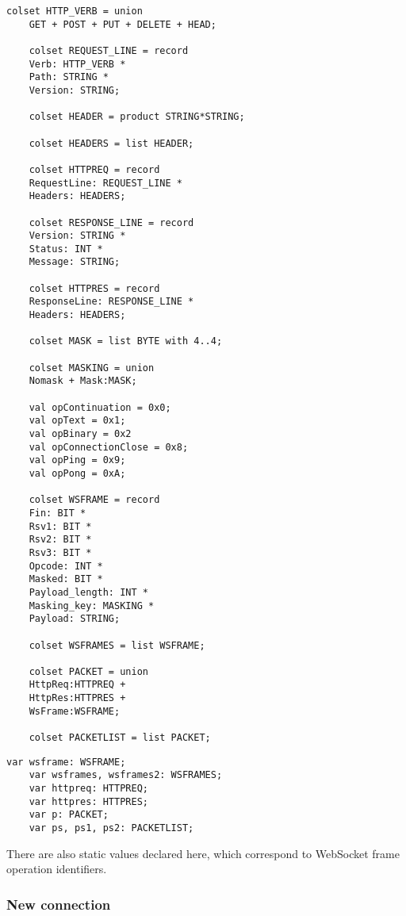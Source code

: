 	\begin{lstlisting}[label=lst:client_lib_colset,caption=Library color
	sets,gobble=1]
	colset HTTP_VERB = union
	GET + POST + PUT + DELETE + HEAD;
	
	colset REQUEST_LINE = record
	Verb: HTTP_VERB *
	Path: STRING *
	Version: STRING;
	
	colset HEADER = product STRING*STRING;
	
	colset HEADERS = list HEADER;
	
	colset HTTPREQ = record
	RequestLine: REQUEST_LINE *
	Headers: HEADERS;
	
	colset RESPONSE_LINE = record
	Version: STRING *
	Status: INT *
	Message: STRING;
	
	colset HTTPRES = record
	ResponseLine: RESPONSE_LINE *
	Headers: HEADERS;
	
	colset MASK = list BYTE with 4..4;
	
	colset MASKING = union
	Nomask + Mask:MASK;
	
	val opContinuation = 0x0;
	val opText = 0x1;
	val opBinary = 0x2
	val opConnectionClose = 0x8;
	val opPing = 0x9;
	val opPong = 0xA;
	
	colset WSFRAME = record
	Fin: BIT *
	Rsv1: BIT *
	Rsv2: BIT *
	Rsv3: BIT *
	Opcode: INT *
	Masked: BIT *
	Payload_length: INT *
	Masking_key: MASKING *
	Payload: STRING;
	
	colset WSFRAMES = list WSFRAME;
	
	colset PACKET = union 
	HttpReq:HTTPREQ + 
	HttpRes:HTTPRES +
	WsFrame:WSFRAME;

	colset PACKETLIST = list PACKET;
	\end{lstlisting}
	
	\begin{lstlisting}[label=lst:client_lib_vars,caption=Library
	variables,gobble=1]
	var wsframe: WSFRAME;
	var wsframes, wsframes2: WSFRAMES;
	var httpreq: HTTPREQ;
	var httpres: HTTPRES;
	var p: PACKET;
	var ps, ps1, ps2: PACKETLIST;
	\end{lstlisting}
	
	There are also static values declared here, which correspond to WebSocket
	frame operation identifiers.
	
	\subsubsection{New connection}
		
		
